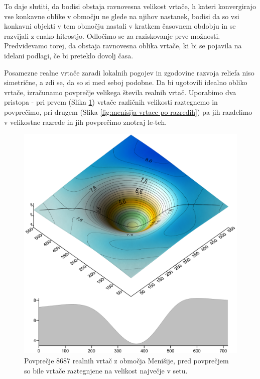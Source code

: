 \documentclass[a4paper, oneside, 12pt]{book}
\begin{document}
        To daje slutiti, da bodisi obstaja ravnovesna velikost vrtače, h kateri konvergirajo vse konkavne oblike v območju ne glede na njihov nastanek, bodisi da so vsi konkavni objekti v tem območju nastali v kratkem časovnem obdobju in se razvijali z enako hitrostjo. Odločimo se za raziskovanje prve možnosti.
        Predvidevamo torej, da obstaja ravnovesna oblika vrtače, ki bi se pojavila na idelani podlagi, če bi preteklo dovolj časa.

        Posamezne realne vrtače zaradi lokalnih pogojev in zgodovine razvoja reliefa niso simetrične, a zdi se, da so si med seboj podobne. Da bi ugotovili idealno obliko vrtače, izračunamo povprečje velikega števila realnih vrtač. Uporabimo dva pristopa - pri prvem (Slika \ref{fig:menisija-vrtaca}) vrtače različnih velikosti raztegnemo in povprečimo, pri drugem (Slika \ref{fig:menisija-vrtace-po-razredih}) pa jih razdelimo v velikostne razrede in jih povprečimo znotraj le-teh. 

        \begin{figure}[H]
          \centering
          \includegraphics[width=13cm]{slike/menisija-vrtaca}
          \caption{Povprečje 8687 realnih vrtač z območja Menišije, pred povprečjem so bile vrtače raztegnjene na velikost največje v setu.}
          \label{fig:menisija-vrtaca}
        \end{figure}
\end{document}
